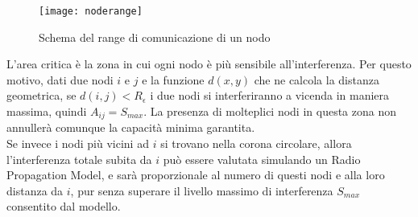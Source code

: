 \begin{wrapfigure}{R}{0.5\textwidth}
	\begin{center}
		\texttt{[image: noderange]}
	\end{center}
	\caption{Schema del range di comunicazione di un nodo\label{fig:noderange}}
\end{wrapfigure}

L'area critica è la zona in cui ogni nodo è più sensibile all'interferenza. Per questo motivo, dati due nodi $i$ e $j$ e la funzione $d(x,y)$ che ne calcola la distanza geometrica, se $d(i,j) < R_\epsilon $ i due nodi si interferiranno a vicenda in maniera massima, quindi $A_{ij} = S_{max}$.
La presenza di molteplici nodi in questa zona non annullerà comunque la capacità minima garantita. \\
Se invece i nodi più vicini ad $i$ si trovano nella corona circolare, allora l'interferenza totale subita da $i$ può essere valutata simulando un Radio Propagation Model, e sarà proporzionale al numero di questi nodi e alla loro distanza da $i$, pur senza superare il livello massimo di interferenza $S_{max}$ consentito dal modello. 


